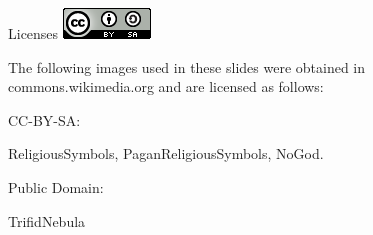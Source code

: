\begin{frame}{Licenses} \centering
\includegraphics[scale=0.5]{Images/CC-BY-SA.png}

\bigskip
\bigskip

\begin{center}
The following images used in these slides were obtained in commons.wikimedia.org and are licensed as follows:

\bigskip

CC-BY-SA:

ReligiousSymbols, PaganReligiousSymbols, NoGod.

\bigskip

Public Domain: 

TrifidNebula
\end{center}
\end{frame}
